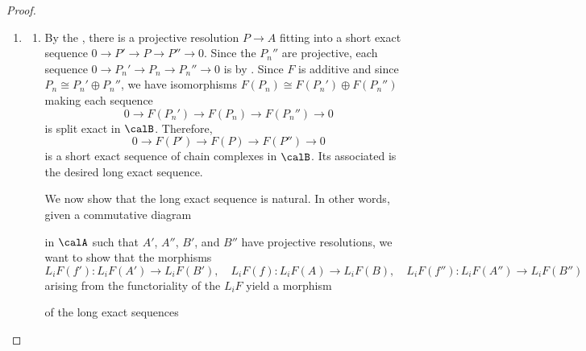 \begin{proof}
\begin{enumerate}
    \item 
    \begin{enumerate}
        \item By the , there is a projective resolution $P \to A$ fitting into a short exact sequence $0 \to P' \to P \to P'' \to 0$. Since the $P_n''$ are projective, each sequence $0 \to P_n' \to P_n \to P_n'' \to 0$ is  by . Since $F$ is additive and since $P_n \cong P_n' \oplus P_n''$, we have isomorphisms $F(P_n) \cong F(P_n') \oplus F(P_n'')$ making each sequence 
        $$0 \to F(P_n') \to F(P_n) \to F(P_n'') \to 0$$
        is split exact in $\calB$. Therefore,
        $$0 \to F(P') \to F(P) \to F(P'') \to 0$$
        is a short exact sequence of chain complexes in $\calB$. Its associated  is the desired long exact sequence. 

        \medskip

        We now show that the long exact sequence is natural. In other words, given a commutative diagram 
        \begin{center}
        \end{center}
        in $\calA$ such that $A'$, $A''$, $B'$, and $B''$ have projective resolutions, we want to show that the morphisms
        $$L_i F(f'): L_i F(A') \to L_iF(B'), \quad L_i F(f): L_i F(A) \to L_iF(B), \quad L_iF(f''): L_i F(A'') \to L_iF(B'')$$
        arising from the functoriality of the $L_i F$ yield a morphism
        \begin{center}
        \end{center}
        of the long exact sequences 
        


\end{enumerate}
\end{enumerate}
\end{proof}
